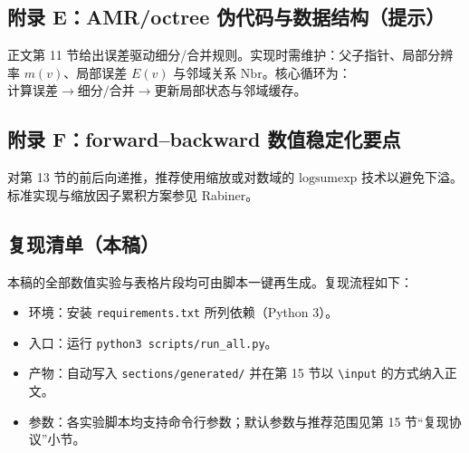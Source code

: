 \subsection{\texorpdfstring{附录 E：AMR/octree 伪代码与数据结构（提示）}{附录 E：AMR/octree 伪代码与数据结构（提示）}}

正文第 11 节给出误差驱动细分/合并规则。实现时需维护：父子指针、局部分辨率 $m(v)$、局部误差 $E(v)$ 与邻域关系 $\mathrm{Nbr}$。核心循环为：$\text{计算误差}\to\text{细分/合并}\to\text{更新局部状态与邻域缓存}$。

\subsection{附录 F：forward--backward 数值稳定化要点}

对第 13 节的前后向递推，推荐使用缩放或对数域的 $\mathrm{logsumexp}$ 技术以避免下溢。标准实现与缩放因子累积方案参见 Rabiner。\cite{rabiner_hmm_tutorial}

\subsection{复现清单（本稿）}

本稿的全部数值实验与表格片段均可由脚本一键再生成。复现流程如下：
\begin{itemize}
  \item 环境：安装 \texttt{requirements.txt} 所列依赖（Python 3）。
  \item 入口：运行 \texttt{python3 scripts/run\_all.py}。
  \item 产物：自动写入 \texttt{sections/generated/} 并在第 15 节以 \texttt{\textbackslash input} 的方式纳入正文。
  \item 参数：各实验脚本均支持命令行参数；默认参数与推荐范围见第 15 节“复现协议”小节。
\end{itemize}
